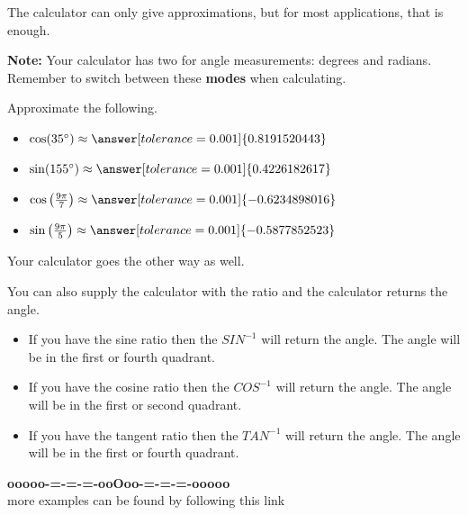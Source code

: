 \documentclass{ximera}
\begin{document}
The calculator can only give approximations, but for most applications, that is enough.


\textbf{Note:}  Your calculator has two  for angle measurements: degrees and radians.  Remember to switch between these \textbf{modes} when calculating.



\begin{question} 

Approximate the following.

\begin{itemize}
\item $\cos(35^{\circ}) \approx \answer[tolerance=0.001]{0.8191520443}$
\item $\sin(155^{\circ}) \approx \answer[tolerance=0.001]{0.4226182617}$
\item $\cos\left( \frac{9\pi}{7} \right) \approx \answer[tolerance=0.001]{-0.6234898016}$
\item $\sin\left( \frac{9\pi}{5} \right) \approx \answer[tolerance=0.001]{-0.5877852523}$
\end{itemize}

\end{question}





Your calculator goes the other way as well. 




You can also supply the calculator with the ratio and the calculator returns the angle.

\begin{itemize}
\item If you have the sine ratio then the $SIN^{-1}$ will return the angle. The angle will be in the first or fourth quadrant.
\item If you have the cosine ratio then the $COS^{-1}$ will return the angle. The angle will be in the first or second quadrant.
\item If you have the tangent ratio then the $TAN^{-1}$ will return the angle. The angle will be in the first or fourth quadrant.
\end{itemize}



























\begin{center}
\textbf{\textcolor{green!50!black}{ooooo-=-=-=-ooOoo-=-=-=-ooooo}} \\

more examples can be found by following this link\\ 

\end{center}
\end{document}
